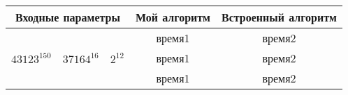 \documentclass[11pt]{article}
\begin{document}
\begin{tabular}{|c|c|c|c|c|}
	\hline
	
	\multicolumn{3}{|c|}{Входные параметры} & Мой алгоритм & Встроенный алгоритм \\[5pt]
	\hline
	$^{}$ & $^{}$ & $^{}$ & время1 & время2\\
	\hline
	$43123^{150}$ & $37164^{16}$ & $2^{12}$ & время1 & время2\\
	\hline
	$^{}$ & $^{}$ & $^{}$ & время1 & время2\\
	
	\hline	
\end{tabular}	
\end{document}
